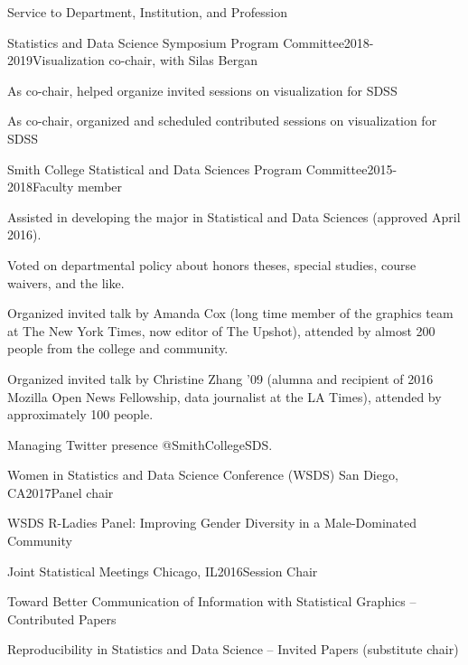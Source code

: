 \documentclass{resume} %
\begin{document}
\begin{rSection}{Service to Department, Institution, and Profession}
\begin{rSubsection}{Statistics and Data Science Symposium Program Committee}{}{2018-2019}{Visualization co-chair, with Silas Bergan}
\item As co-chair, helped organize invited sessions on visualization for SDSS
\item As co-chair, organized and scheduled contributed sessions on visualization for SDSS
\end{rSubsection}


\begin{rSubsection}{Smith College Statistical and Data Sciences Program Committee}{}{2015-2018}{Faculty member}
\item Assisted in developing the major in Statistical and Data Sciences (approved April 2016).
\item Voted on departmental policy about honors theses, special studies, course waivers, and the like. 
\item Organized invited talk by Amanda Cox (long time member of the graphics team at The New York Times, now editor of The Upshot), attended by almost 200 people from the college and community. 
\item Organized invited talk by Christine Zhang '09 (alumna and recipient of 2016 Mozilla Open News Fellowship, data journalist at the LA Times), attended by approximately 100 people. 
\item Managing Twitter presence @SmithCollegeSDS. 
\end{rSubsection}


\begin{rSubsection}{Women in Statistics and Data Science Conference (WSDS)}{ San Diego, CA}{2017}{Panel chair}
\item WSDS R-Ladies Panel: Improving Gender Diversity in a Male-Dominated Community
\end{rSubsection}

\begin{rSubsection}{Joint Statistical Meetings}{ Chicago, IL}{2016}{Session Chair}
\item Toward Better Communication of Information with Statistical Graphics -- Contributed Papers
\item Reproducibility in Statistics and Data Science -- Invited Papers (substitute chair)
\end{rSubsection}


\end{rSection}
\end{document}
